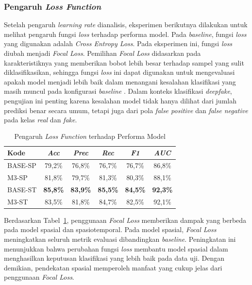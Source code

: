\subsubsection{Pengaruh \textit{Loss Function}} \label{IV.Eksperimen_Ablation_Loss}
Setelah pengaruh \textit{learning rate} dianalisis, eksperimen berikutnya dilakukan untuk melihat pengaruh fungsi \textit{loss} terhadap performa model. Pada \textit{baseline}, fungsi \textit{loss} yang digunakan adalah \textit{Cross Entropy Loss}. Pada eksperimen ini, fungsi \textit{loss} diubah menjadi \textit{Focal Loss}. Pemilihan \textit{Focal Loss} didasarkan pada karakteristiknya yang memberikan bobot lebih besar terhadap sampel yang sulit diklasifikasikan, sehingga fungsi \textit{loss} ini dapat digunakan untuk mengevaluasi apakah model menjadi lebih baik dalam menangani kesalahan klasifikasi yang masih muncul pada konfigurasi \textit{baseline} \cite{lin2018focallossdenseobject}. Dalam konteks klasifikasi \textit{deepfake}, pengujian ini penting karena kesalahan model tidak hanya dilihat dari jumlah prediksi benar secara umum, tetapi juga dari pola \textit{false positive} dan \textit{false negative} pada kelas \textit{real} dan \textit{fake}.

\begin{table}[htbp]
\centering
\caption{Pengaruh \textit{Loss Function} terhadap Performa Model}
\label{table:4.ablation-loss}
\begin{tabular}{lccccc}
\toprule
\textbf{Kode} &
\textbf{\textit{Acc}} &
\textbf{\textit{Prec}} &
\textbf{\textit{Rec}} &
\textbf{\textit{F1}} &
\textbf{\textit{AUC}} \\
\midrule
BASE-SP & 79,2\% & 76,8\% & 76,7\% & 76,7\% & 86,8\% \\
M3-SP & 81,8\% & 79,7\% & 81,3\% & 80,3\% & 88,1\% \\
BASE-ST & \textbf{85,8\%} & \textbf{83,9\%} & \textbf{85,5\%} & \textbf{84,5\%} & \textbf{92,3\%} \\
M3-ST & 83,5\% & 81,8\% & 84,7\% & 82,5\% & 92,1\% \\
\bottomrule
\end{tabular}
\end{table}

Berdasarkan Tabel~\ref{table:4.ablation-loss}, penggunaan \textit{Focal Loss} memberikan dampak yang berbeda pada model spasial dan spasiotemporal. Pada model spasial, \textit{Focal Loss} meningkatkan seluruh metrik evaluasi dibandingkan \textit{baseline}. Peningkatan ini menunjukkan bahwa perubahan fungsi \textit{loss} membantu model spasial dalam menghasilkan keputusan klasifikasi yang lebih baik pada data uji. Dengan demikian, pendekatan spasial memperoleh manfaat yang cukup jelas dari penggunaan \textit{Focal Loss}.

